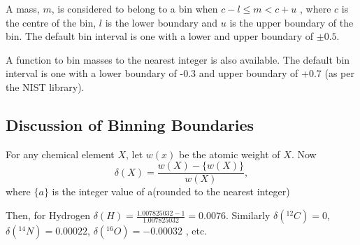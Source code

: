 A mass, $m$, is considered to belong to a bin when
$c - l \le m < c + u$
, where $c$ is the centre of the bin, $l$ is the lower boundary and $u$ is
the upper boundary of the bin. The default bin interval is one with a lower and
upper boundary of $\pm0.5$.

A function to bin masses to the nearest integer is also available. The default
bin interval is one with a lower boundary of -0.3 and upper boundary of +0.7 (as
per the NIST library).



\subsection{Discussion of Binning Boundaries}

For any chemical element \begin{math}X\end{math}, let \begin{math}w(x)\end{math} 
be the atomic weight of \begin{math}X\end{math}. 
Now 
\begin{equation}
\delta(X) = \frac{w(X) - \{w(X)\}}{w(X)}, 
\end{equation}
where \begin{math}\{a\}\end{math} is the integer value of a(rounded to the 
nearest integer)

Then, for Hydrogen \begin{math}\delta(H) = \frac{1.007825032 - 1}{1.007825032} = 
0.0076\end{math}. Similarly \begin{math}\delta(^{12}C) = 0\end{math}, \begin{math}
\delta(^{14}N) = 0.00022\end{math}, \begin{math}\delta(^{16}O) = -0.00032\end{math}
, etc.

